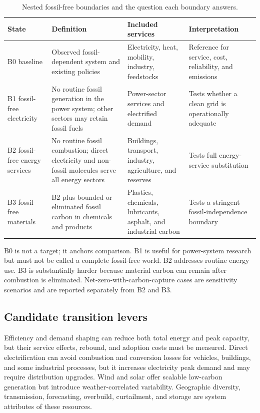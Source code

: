 \documentclass[conference]{IEEEtran}
\begin{document}
\begin{table}[t]
\centering
\caption{Nested fossil-free boundaries and the question each boundary answers.}
\label{tab:boundaries}
\setlength{\tabcolsep}{4pt}
\begin{tabular}{>{\raggedright\arraybackslash}p{}>{\raggedright\arraybackslash}p{}>{\raggedright\arraybackslash}p{}>{\raggedright\arraybackslash}p{}}
\toprule
State & Definition & Included services & Interpretation\\
\midrule
B0 baseline & Observed fossil-dependent system and existing policies & Electricity, heat, mobility, industry, feedstocks & Reference for service, cost, reliability, and emissions\\
B1 fossil-free electricity & No routine fossil generation in the power system; other sectors may retain fossil fuels & Power-sector services and electrified demand & Tests whether a clean grid is operationally adequate\\
B2 fossil-free energy services & No routine fossil combustion; direct electricity and non-fossil molecules serve all energy sectors & Buildings, transport, industry, agriculture, and reserves & Tests full energy-service substitution\\
B3 fossil-free materials & B2 plus bounded or eliminated fossil carbon in chemicals and products & Plastics, chemicals, lubricants, asphalt, and industrial carbon & Tests a stringent fossil-independence boundary\\
\bottomrule
\end{tabular}
\end{table}

B0 is not a target; it anchors comparison. B1 is useful for power-system research but must not be called a complete fossil-free world. B2 addresses routine energy use. B3 is substantially harder because material carbon can remain after combustion is eliminated. Net-zero-with-carbon-capture cases are sensitivity scenarios and are reported separately from B2 and B3.

\subsection{Candidate transition levers}
Efficiency and demand shaping can reduce both total energy and peak capacity, but their service effects, rebound, and adoption costs must be measured. Direct electrification can avoid combustion and conversion losses for vehicles, buildings, and some industrial processes, but it increases electricity peak demand and may require distribution upgrades. Wind and solar offer scalable low-carbon generation but introduce weather-correlated variability. Geographic diversity, transmission, forecasting, overbuild, curtailment, and storage are system attributes of these resources.
\end{document}
